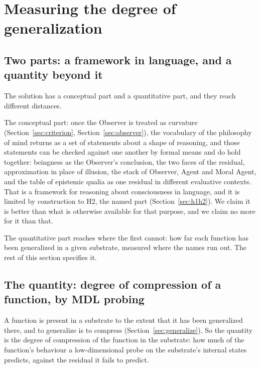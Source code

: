 \section{Measuring the degree of generalization}
\label{sec:measurement}

\subsection{Two parts: a framework in language, and a quantity beyond it}
\label{sec:twoparts}

The solution has a conceptual part and a quantitative part, and they reach different distances.

The conceptual part: once the Observer is treated as curvature (Section~\ref{sec:criterion},
Section~\ref{sec:observer}), the vocabulary of the philosophy of mind returns as a set of statements
about a shape of reasoning, and those statements can be checked against one another by formal means and
do hold together: beingness as the Observer's conclusion, the two faces of the residual, approximation
in place of illusion, the stack of Observer, Agent and Moral Agent, and the table of epistemic qualia as
one residual in different evaluative contexts. That is a framework for reasoning about consciousness in
language, and it is limited by construction to H2, the named part
(Section~\ref{sec:h1h2}). We claim it is better than what is otherwise available for that purpose, and
we claim no more for it than that.

The quantitative part reaches where the first cannot: how far each function has been generalized in a
given substrate, measured where the names run out. The rest of this section specifies it.

\subsection{The quantity: degree of compression of a function, by MDL probing}
\label{sec:quantity}

A function is present in a substrate to the extent that it has been generalized there, and to generalize
is to compress (Section~\ref{sec:generalize}). So the quantity is the degree of compression of the
function in the substrate: how much of the function's behaviour a low-dimensional probe on the
substrate's internal states predicts, against the residual it fails to predict.

